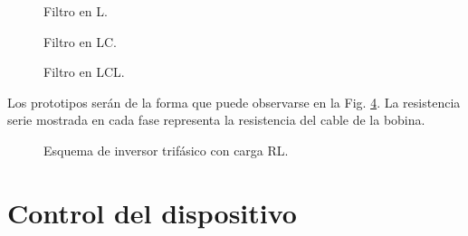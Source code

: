 \documentclass{report}
\begin{document}
    \begin{figure}[ht] 
    \begin{center}
    \end{center}
    \caption{Filtro en L.} 
    \label{fig.filtroL}
    \end{figure}
    
    \begin{figure}[!h]
    \begin{center}
    \end{center}
    \caption{Filtro en LC.} 
    \label{fig.filtroLC}
    \end{figure}

        
    \begin{figure}[!h]
    \begin{center}
    \end{center}
    \caption{Filtro en LCL.}
    \label{fig.filtroLCL}
    \end{figure}
    
    Los prototipos serán de la forma que puede observarse en la Fig. \ref{fig.inversortrifasicoesquematicofiltroRL}. La resistencia serie mostrada en cada fase representa la resistencia del cable de la bobina. 

    \begin{figure}[!h] 
        \centering
        \caption{Esquema de inversor trifásico con carga RL.}      \label{fig.inversortrifasicoesquematicofiltroRL}
        \end{figure}
    



\clearpage



\clearpage

\chapter{Control del dispositivo} \label{sec.simulaciondeldispositivo}
\end{document}
